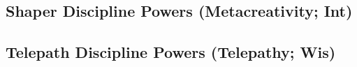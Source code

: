 \subsection{Shaper Discipline Powers {\normalsize(Metacreativity; Int)}}
\begin{enumerate*}
\item
\item
\item
\item
\item
\item
\item
\item
\item
\end{enumerate*}



\subsection{Telepath Discipline Powers {\normalsize(Telepathy; Wis)}}
\begin{enumerate*}
\item
\item
\item
\item
\item
\item
\item
\item
\item
\end{enumerate*}